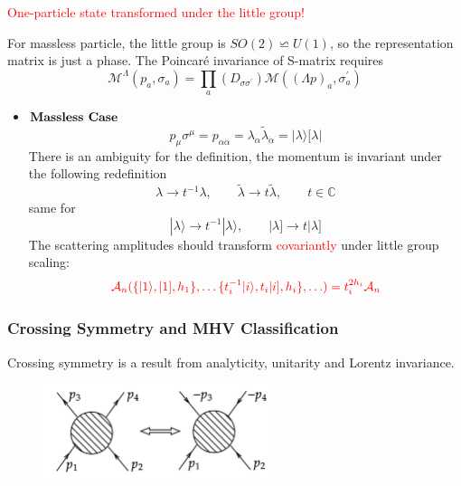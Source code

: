 \documentclass{beamer}
\newcommand{\aket}[1]{|#1\rangle}
\newcommand{\sket}[1]{|#1]}
\begin{document}
\begin{frame}
    \textcolor{red}{One-particle state transformed under the little group!}

    For massless particle, the little group is $SO(2)\backsimeq U(1)$, so the representation matrix is just a phase.
    The Poincaré invariance of S-matrix requires 
    \begin{equation*}
        \mathcal{M}^\Lambda(p_a,\sigma_a)=\prod_{a}(D_{\sigma\sigma^{'}})\mathcal{M}((\Lambda p)_a,\sigma_a^{'})
    \end{equation*}
      \begin{itemize}
        \item $\textbf{\text{Massless Case}}$\\
    \begin{equation*}
        p_\mu \sigma^\mu=p_{\alpha\dot{\alpha}}=\lambda_\alpha \tilde{\lambda}_{\dot{\alpha}}=\aket{\lambda}[\lambda|
    \end{equation*}
    There is an ambiguity for the definition, the momentum is invariant under the following redefinition
    \begin{equation*}
        \lambda \rightarrow t^{-1}\lambda, \qquad \tilde{\lambda}\rightarrow t\tilde{\lambda}, \qquad t\in\mathbb{C} 
    \end{equation*}
    same for
    \begin{equation*}
        \aket{\lambda}\rightarrow t^{-1}\aket{\lambda}, \qquad \sket{\lambda}\rightarrow t\sket{\lambda}
    \end{equation*}
    The scattering amplitudes should transform \textcolor{red}{covariantly} under little group scaling:
    \begin{equation*}
        \color{red} \mathcal{A}_n(\{\aket{1},\sket{1},h_1\},\ldots\{t_i^{-1}\aket{i},t_i\sket{i},h_i\},\ldots )=t_i^{2h_i}\mathcal{A}_n
    \end{equation*}
    \end{itemize}
\end{frame}

\begin{frame}
    \frametitle{Crossing Symmetry and MHV Classification}
    Crossing symmetry is a result from analyticity, unitarity and Lorentz invariance. 
    \begin{figure}
        \centering
        \includegraphics[width=0.6\textwidth]{CrossingSYM.png}
    \end{figure}
\end{frame}
\end{document}
